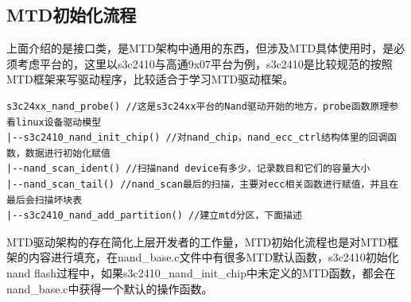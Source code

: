 \subsection{MTD初始化流程}
上面介绍的是接口类，是MTD架构中通用的东西，但涉及MTD具体使用时，是必须考虑平台的，这里以s3c2410与高通9x07平台为例，s3c2410是比较规范的按照MTD框架来写驱动程序，比较适合于学习MTD驱动框架。
\begin{mdframed}[style=leftredline]
\begin{verbatim}
s3c24xx_nand_probe() //这是s3c24xx平台的Nand驱动开始的地方，probe函数原理参看linux设备驱动模型
|--s3c2410_nand_init_chip() //对nand_chip，nand_ecc_ctrl结构体里的回调函数，数据进行初始化赋值
|--nand_scan_ident() //扫描nand device有多少，记录数目和它们的容量大小
|--nand_scan_tail() //nand_scan最后的扫描，主要对ecc相关函数进行赋值，并且在最后会扫描坏块表
|--s3c2410_nand_add_partition() //建立mtd分区，下面描述
\end{verbatim}
\end{mdframed}
MTD驱动架构的存在简化上层开发者的工作量，MTD初始化流程也是对MTD框架的内容进行填充，在nand\_base.c文件中有很多MTD默认函数，s3c2410初始化nand flash过程中，如果s3c2410\_nand\_init\_chip中未定义的MTD函数，都会在nand\_base.c中获得一个默认的操作函数。

